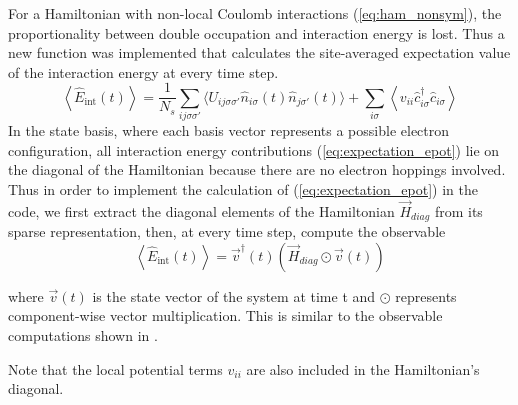 For a Hamiltonian with non-local Coulomb interactions (\ref{eq:ham_nonsym}), the proportionality between double occupation and interaction energy is lost. Thus a new function was implemented that calculates the site-averaged expectation value of the interaction energy at every time step.
\begin{equation}
    \left\langle{\hat{E}_{\text{int}}(t)}\right\rangle = \frac{1}{N_s} \sum_{ij\sigma\sigma'} \Big\langle{U_{ij\sigma\sigma'}\hat{n}_{i \sigma}(t) \hat{n}_{j\sigma'}(t)}\Big\rangle + \sum_{i\sigma} \left\langle v_{ii} \hat{c}_{i \sigma}^{\dagger} \hat{c}_{i \sigma}\right\rangle
    \label{eq:expectation_epot}
\end{equation}
In the state basis, where each basis vector represents a possible electron configuration, all interaction energy contributions (\ref{eq:expectation_epot}) lie on the diagonal of the Hamiltonian because there are no electron hoppings involved. Thus in order to implement the calculation of (\ref{eq:expectation_epot}) in the code, we first extract the diagonal elements of the Hamiltonian $\vec{H}_{diag}$ from its sparse representation, then, at every time step, compute the observable
\begin{equation}
     \left\langle{\hat{E}_{\text{int}}(t)}\right\rangle = \vec{v}^\dagger(t) \left(\vec{H}_{diag} \odot \vec{v}(t)\right) 
     \label{eq:expecation_epot_code}
\end{equation}

where $\vec{v}(t)$ is the state vector of the system at time t and $\odot$ represents component-wise vector multiplication. This is similar to the observable computations shown in \cite{innerberger}.
\medskip

Note that the local potential terms $v_{ii}$ are also included in the Hamiltonian's diagonal.


